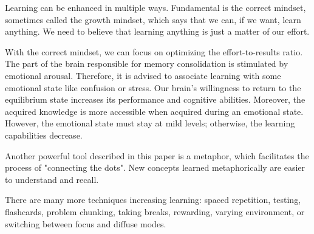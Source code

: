 \documentclass{article}
\begin{document}
Learning can be enhanced in multiple ways. Fundamental is the correct mindset, sometimes called the growth mindset, which says that we can, if we want, learn anything. We need to believe that learning anything is just a matter of our effort. 

With the correct mindset, we can focus on optimizing the effort-to-results ratio. The part of the brain responsible for memory consolidation is stimulated by emotional arousal. Therefore, it is advised to associate learning with some emotional state like confusion or stress. Our brain's willingness to return to the equilibrium state increases its performance and cognitive abilities. Moreover, the acquired knowledge is more accessible when acquired during an emotional state. However, the emotional state must stay at mild levels; otherwise, the learning capabilities decrease. 

Another powerful tool described in this paper is a metaphor, which facilitates the process of "connecting the dots". New concepts learned metaphorically are easier to understand and recall. 

There are many more techniques increasing learning: spaced repetition, testing, flashcards, problem chunking, taking breaks, rewarding, varying environment, or switching between focus and diffuse modes. 



\end{document}
